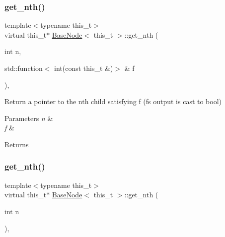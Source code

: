 \subsubsection{\texorpdfstring{get\+\_\+nth()}{get\_nth()}\hspace{0.1cm}{\footnotesize\ttfamily [1/2]}}
{\footnotesize\ttfamily template$<$typename this\+\_\+t$>$ \\
virtual this\+\_\+t$\ast$ \hyperlink{class_base_node}{Base\+Node}$<$ this\+\_\+t $>$\+::get\+\_\+nth (\begin{DoxyParamCaption}\item[{int}]{n,  }\item[{std\+::function$<$ int(const this\+\_\+t \&)$>$ \&}]{f }\end{DoxyParamCaption})\hspace{0.3cm}{\ttfamily [inline]}, {\ttfamily [virtual]}}

Return a pointer to the n\textquotesingle{}th child satisfying f (f\textquotesingle{}s output is cast to bool) 
\begin{DoxyParams}{Parameters}
{\em n} & \\
\hline
{\em f} & \\
\hline
\end{DoxyParams}
\begin{DoxyReturn}{Returns}

\end{DoxyReturn}
\mbox{\label{class_base_node_a9381814fdc86029905dc283da5d3d931}} 
\subsubsection{\texorpdfstring{get\+\_\+nth()}{get\_nth()}\hspace{0.1cm}{\footnotesize\ttfamily [2/2]}}
{\footnotesize\ttfamily template$<$typename this\+\_\+t$>$ \\
virtual this\+\_\+t$\ast$ \hyperlink{class_base_node}{Base\+Node}$<$ this\+\_\+t $>$\+::get\+\_\+nth (\begin{DoxyParamCaption}\item[{int}]{n }\end{DoxyParamCaption})\hspace{0.3cm}{\ttfamily [inline]}, {\ttfamily [virtual]}}

\mbox{\label{class_base_node_add31235ad96e659230cbca6c9e357523}} 
